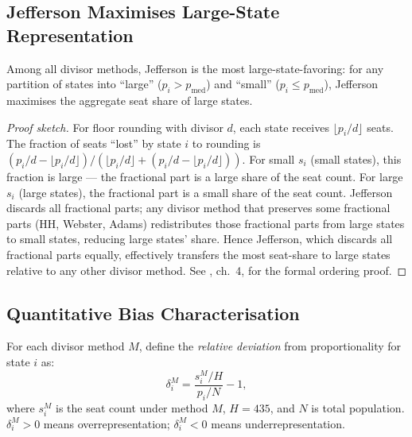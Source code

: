 \label{sec:bias}

\subsection{Jefferson Maximises Large-State Representation}

\begin{theorem}
  \label{thm:jefferson-bias}
  Among all divisor methods, Jefferson is the most large-state-favoring:
  for any partition of states into ``large'' ($p_i > p_{\text{med}}$)
  and ``small'' ($p_i \leq p_{\text{med}}$), Jefferson maximises the
  aggregate seat share of large states.
\end{theorem}

\begin{proof}[Proof sketch]
  For floor rounding with divisor $d$, each state receives $\lfloor p_i/d \rfloor$
  seats.
  The fraction of seats ``lost'' by state $i$ to rounding is
  $(p_i/d - \lfloor p_i/d \rfloor)/(\lfloor p_i/d \rfloor + (p_i/d - \lfloor p_i/d \rfloor))$.
  For small $s_i$ (small states), this fraction is large ---
  the fractional part is a large share of the seat count.
  For large $s_i$ (large states), the fractional part is a small
  share of the seat count.
  Jefferson discards all fractional parts; any divisor method that
  preserves some fractional parts (HH, Webster, Adams) redistributes
  those fractional parts from large states to small states,
  reducing large states' share.
  Hence Jefferson, which discards all fractional parts equally,
  effectively transfers the most seat-share to large states
  relative to any other divisor method.
  See \citet{balinski1982fair}, ch.~4, for the formal ordering proof.
\end{proof}

\subsection{Quantitative Bias Characterisation}

For each divisor method $M$, define the \emph{relative deviation}
from proportionality for state $i$ as:
\[
  \delta_i^M = \frac{s_i^M/H}{p_i/N} - 1,
\]
where $s_i^M$ is the seat count under method $M$, $H = 435$,
and $N$ is total population.
$\delta_i^M > 0$ means overrepresentation; $\delta_i^M < 0$ means
underrepresentation.


